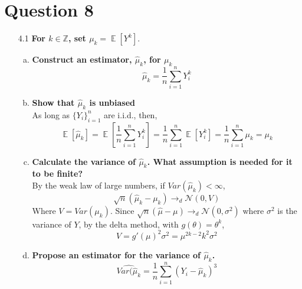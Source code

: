 \documentclass{article}
\newcommand{\N}{\mathcal{N}}
\newcommand{\Z}{\mathbb{Z}}
\DeclareMathOperator{\E}{\mathbb{E}}%
\begin{document}
\pagebreak
\section*{Question 8}
\begin{itemize}
	\item[4.1] \textbf{For $k\in\Z$, set $\mu_k=\E[Y^k]$}.
		\begin{enumerate}[(a)]
			\item \textbf{Construct an estimator, $\hat{\mu}_k$, for $\mu_k$} \\
				\[
					\hat{\mu}_k = \frac{1}{n}\sum_{i=1}^nY_i^k
				\]
			
			\item \textbf{Show that $\hat{\mu}_k$ is unbiased} \\
				As long as $\{Y_i\}_{i=1}^n$ are i.i.d., then,
				\[
					\E[\hat{\mu}_k] = \E[\frac{1}{n}\sum_{i=1}^nY_i^k] = \frac{1}{n}\sum_{i=1}^n\E[Y_i^k] = \frac{1}{n}\sum_{i=1}^n\mu_k = \mu_k
				\]
			
			\item \textbf{Calculate the variance of $\hat{\mu}_k$. What assumption is needed for it to be finite?} \\
				By the weak law of large numbers, if $Var\left(\hat{\mu}_k\right)<\infty$,
				\[
					\sqrt{n}\left(\hat{\mu}_k - \mu_k\right)\rightarrow_d\N\left(0,V\right)
				\]
				Where $V=Var(\mu_k)$. Since ${\sqrt{n}\left(\hat{\mu} - \mu\right)\rightarrow_d\N\left(0,\sigma^2\right)}$ where $\sigma^2$ is the variance of $Y$, by the delta method, with ${g(\theta)=\theta^k}$,
				\[
					V= g'(\mu)^2\sigma^2 = \mu^{2k-2}k^2\sigma^2
				\]
			
			\item \textbf{Propose an estimator for the variance of $\hat{\mu}_k$.} \\
				\[
					\widehat{Var(\hat{\mu}_k} = \frac{1}{n}\sum_{i=1}^n \left(Y_i - \hat{\mu}_k\right)^3
				\]
			
		\end{enumerate}
		

\end{itemize}
\end{document}
